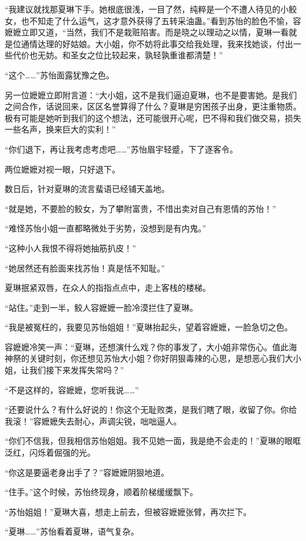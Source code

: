 \begin{this_body}
“我建议就找那夏琳下手。她根底很浅，一目了然，纯粹是一个不遭人待见的小鲛女，也不知走了什么运气，这才意外获得了五转采油蛊。”看到苏怡的脸色不愉，容嬷嬷立即又道，“当然，我们不是栽赃陷害。而是晓之以理动之以情，夏琳一看就是位通情达理的好姑娘。大小姐，你不妨将此事交给我处理，我来找她谈，付出一些代价也无妨。和圣女之位比较起来，孰轻孰重谁都清楚！”

“这个……”苏怡面露犹豫之色。

另一位嬷嬷立即附言道：“大小姐，这不是我们逼迫夏琳，也不是要害她。是我们之间合作，话说回来，区区名誉算得了什么？夏琳是穷困孩子出身，更注重物质。极有可能是她听到我们的这个想法，还可能很开心呢，巴不得和我们做交易，损失一些名声，换来巨大的实利！”

“你们退下，再让我考虑考虑吧……”苏怡眉宇轻蹙，下了逐客令。

两位嬷嬷对视一眼，只好退下。

数日后，针对夏琳的流言蜚语已经铺天盖地。

“就是她，不要脸的鲛女，为了攀附富贵，不惜出卖对自己有恩情的苏怡！”

“难怪苏怡小姐一直都略微处于劣势，没想到是有内鬼。”

“这种小人我恨不得将她抽筋扒皮！”

“她居然还有脸面来找苏怡！真是恬不知耻。”

夏琳抿紧双唇，在众人的指指点点中，走上客栈的楼梯。

“站住。”走到一半，鲛人容嬷嬷一脸冷漠拦住了夏琳。

“我是被冤枉的，我要见苏怡姐姐！”夏琳抬起头，望着容嬷嬷，一脸急切之色。

容嬷嬷冷笑一声：“夏琳，还想演什么戏？你的事发了，大小姐非常伤心。值此海神祭的关键时刻，你还想见苏怡大小姐？你好阴狠毒辣的心思，是想恶心我们大小姐，让我们接下来发挥失常吗？”

“不是这样的，容嬷嬷，您听我说……”

“还要说什么？有什么好说的！你这个无耻败类，是我们瞎了眼，收留了你。你给我滚！”容嬷嬷失去耐心，声调尖锐，咄咄逼人。

“你们不信我，但我相信苏怡姐姐。我不见她一面，我是绝不会走的！”夏琳的眼眶泛红，闪烁着倔强的光。

“你这是要逼老身出手了？”容嬷嬷阴狠地道。

“住手。”这个时候，苏怡终现身，顺着阶梯缓缓飘下。

“苏怡姐姐！”夏琳大喜，想走上前去，但被容嬷嬷张臂，再次拦下。

“夏琳……”苏怡看着夏琳，语气复杂。


\end{this_body}

